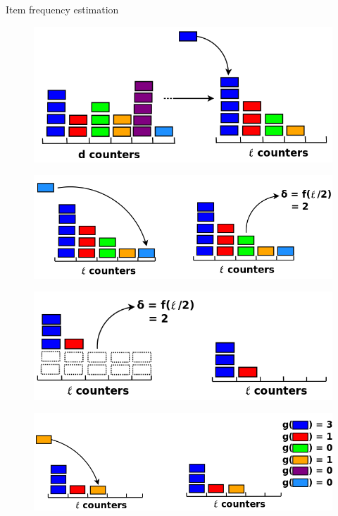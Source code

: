 \documentclass[first=dgreen,second=purple,logo=redque]{aaltoslides}
\begin{document}
\begin{frame}[allowframebreaks=1]{Item frequency estimation}
\framebreak

\begin{figure}
  \includegraphics[scale=0.35]{plots/fi2}
 \label{fig:fi2}
\end{figure}

\framebreak

\begin{figure}
  \includegraphics[scale=0.32]{plots/fi3}
 \label{fig:fi3}
\end{figure}

\framebreak

\begin{figure}
  \includegraphics[scale=0.35]{plots/fi4}
 \label{fig:fi4}
\end{figure}

\framebreak

\begin{figure}
  \includegraphics[scale=0.3]{plots/fi5}
 \label{fig:fi5}
\end{figure}


\end{frame}
\end{document}
